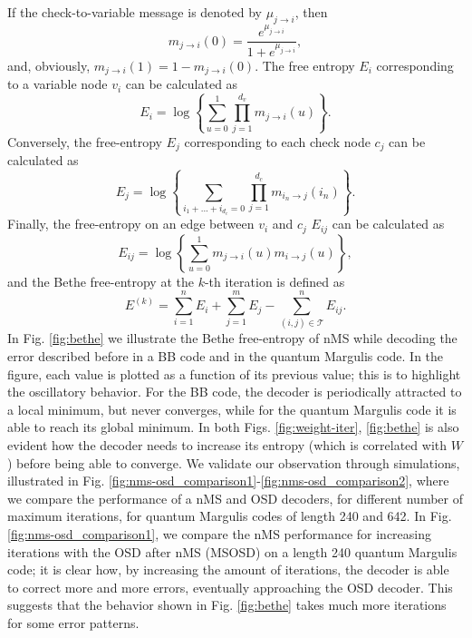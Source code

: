 \documentclass[a4paper,twocolumn,11pt,accepted=2026-05-03]{quantumarticle}
\begin{document}
If the check-to-variable message is denoted by $\mu_{j\rightarrow i}$, then 
\begin{equation}
   m_{j\rightarrow i}(0) = \frac{e^{\mu_{j\rightarrow i}}}{1+e^{\mu_{j\rightarrow i}}},
\end{equation}
and, obviously, $m_{j\rightarrow i}(1) = 1-m_{j\rightarrow i}(0)$. The free entropy $E_i$ corresponding to a variable node $v_i$ can be calculated as
\begin{equation}
    E_i = \log \left \{\sum_{u=0}^1 \prod_{j=1}^{d_v} m_{j\rightarrow i}(u) \right \}.
\end{equation}
Conversely, the free-entropy $E_j$ corresponding to each check node $c_j$ can be calculated as
\begin{equation}
    E_j = \log \left \{ \sum_{i_1+...+i_{d_c}=0} \prod _{j=1}^{d_c } m_{i_n\rightarrow j}(i_n) \right \}.
\end{equation}
Finally, the free-entropy on an edge between $v_i$ and $c_j$ $E_{ij}$ can be calculated as
\begin{equation}
    E_{ij} = \log \left \{  \sum_{u=0}^1  m_{j\rightarrow i}(u)  m_{i\rightarrow j}(u)\right \},
\end{equation}
and the Bethe free-entropy at the $k$-th iteration is defined as 
\begin{equation}
    E^{(k)} = \sum_{i=1}^n E_i + \sum_{j=1}^m E_j - \sum_{(i,j) \in \mathcal{T}}^n E_{ij}.
    \label{eq:entropy}
\end{equation}
 In Fig. \ref{fig:bethe} we illustrate the Bethe free-entropy of nMS while decoding the error described before in a BB code and in the quantum Margulis code. In the figure, each value is plotted as a function of its previous value; this is to highlight the oscillatory behavior. For the BB code, the decoder is periodically attracted to a local minimum, but never converges, while for the quantum Margulis code it is able to reach its global minimum. In both Figs. \ref{fig:weight-iter}, \ref{fig:bethe} is also evident how the decoder needs to increase its entropy (which is correlated with $W$) before being able to converge.
We validate our observation through simulations, illustrated in Fig. \ref{fig:nms-osd_comparison1}-\ref{fig:nms-osd_comparison2}, where we compare the performance of a nMS and OSD decoders, for different number of maximum iterations, for quantum Margulis codes of length 240 and 642. In Fig. \ref{fig:nms-osd_comparison1}, we compare the nMS performance for increasing iterations with the  OSD after nMS (MSOSD) on a length 240 quantum Margulis code; it is clear how, by increasing the amount of iterations, the decoder is able to correct more and more errors, eventually approaching the OSD decoder. This suggests that the behavior shown in Fig. \ref{fig:bethe} takes much more iterations for some error patterns.
\end{document}
